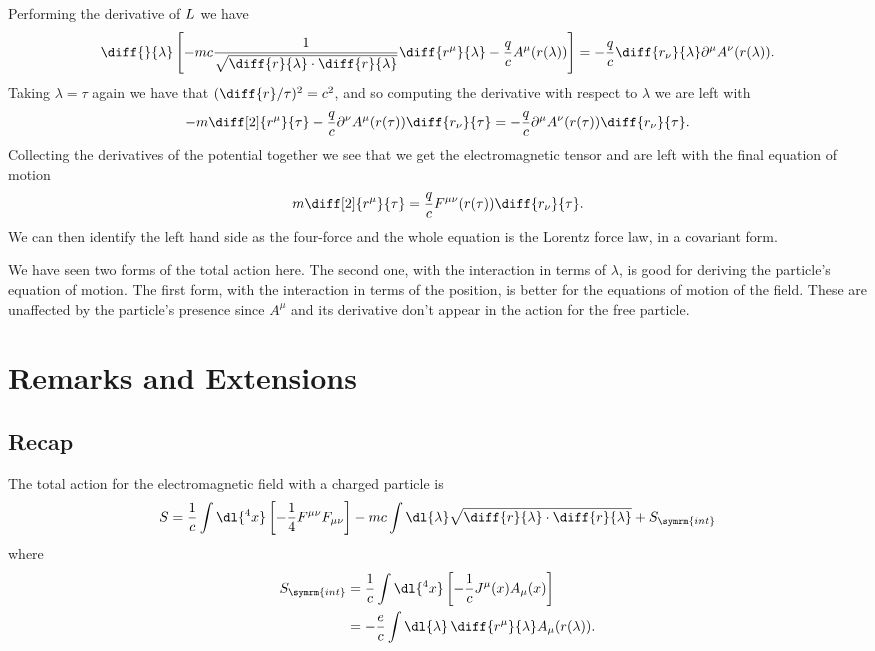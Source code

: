 Performing the derivative of \(L\) we have
\begin{equation}
    \diff{}{\lambda} \left[ -mc \frac{1}{\sqrt{\diff{r}{\lambda} \cdot \diff{r}{\lambda}}} \diff{r^\mu}{\lambda} - \frac{q}{c}A^\mu(r(\lambda)) \right] = -\frac{q}{c} \diff{r_\nu}{\lambda} \partial^\mu A^\nu(r(\lambda)).
\end{equation}
Taking \(\lambda = \tau\) again we have that \((\diff{r}/{\tau})^2 = c^2\), and so computing the derivative with respect to \(\lambda\) we are left with
\begin{equation}
    -m\diff[2]{r^\mu}{\tau} - \frac{q}{c}\partial^\nu A^\mu(r(\tau)) \diff{r_\nu}{\tau} = -\frac{q}{c}\partial^\mu A^\nu(r(\tau)) \diff{r_\nu}{\tau}.
\end{equation}
Collecting the derivatives of the potential together we see that we get the electromagnetic tensor and are left with the final equation of motion
\begin{equation}
    m \diff[2]{r^\mu}{\tau} = \frac{q}{c}F^{\mu\nu}(r(\tau)) \diff{r_\nu}{\tau}.
\end{equation}
We can then identify the left hand side as the four-force and the whole equation is the Lorentz force law, in a covariant form.

We have seen two forms of the total action here.
The second one, with the interaction in terms of \(\lambda\), is good for deriving the particle's equation of motion.
The first form, with the interaction in terms of the position, is better for the equations of motion of the field.
These are unaffected by the particle's presence since \(A^\mu\) and its derivative don't appear in the action for the free particle.

\chapter{Remarks and Extensions}
\section{Recap}
The total action for the electromagnetic field with a charged particle is
\begin{equation}
    S = \frac{1}{c} \int\dl{^4x} \left[ -\frac{1}{4} F^{\mu\nu}F_{\mu\nu} \right] - mc \int \dl{\lambda} \sqrt{\diff{r}{\lambda} \cdot \diff{r}{\lambda}} + S_{\symrm{int}}
\end{equation}
where
\begin{align}
    S_{\symrm{int}} &= \frac{1}{c} \int \dl{^4x} \left[ -\frac{1}{c}J^\mu(x)A_\mu(x) \right]\\
    &= -\frac{e}{c} \int \dl{\lambda} \, \diff{r^\mu}{\lambda} A_\mu(r(\lambda)).
\end{align}

